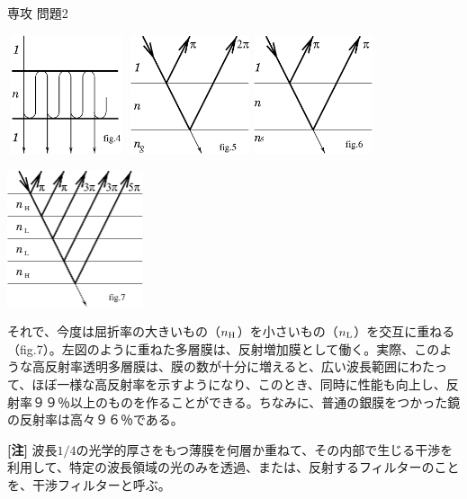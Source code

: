 \documentclass[fleqn]{jbook}
\begin{document}
\begin{answer}{専攻 問題2}{}
\begin{subanswers}
\begin{center}
\includegraphics[clip,height=35mm,width=35mm]{1997phy2-4.eps}\hspace{15mm}
\includegraphics[clip,height=35mm,width=35mm]{1997phy2-5.eps}\hspace{15mm}
\includegraphics[clip,height=35mm,width=35mm]{1997phy2-6.eps}
\end{center}

\parbox[t]{50mm}{\vspace*{-5mm}
\begin{center}
\includegraphics[clip,height=40mm,width=40mm]{1997phy2-7.eps}
\end{center}}\parbox[t]{110mm}{それで、今度は屈折率の大きいもの（$n_{\rm{H}}$）を小さいもの（$n_{\rm{L}}$）を交互に重ねる（fig.7）。左図のように重ねた多層膜は、反射増加膜として働く。実際、このような高反射率透明多層膜は、膜の数が十分に増えると、広い波長範囲にわたって、ほぼ一様な高反射率を示すようになり、このとき、同時に性能も向上し、反射率９９％以上のものを作ることができる。ちなみに、普通の銀膜をつかった鏡の反射率は高々９６％である。 

{\bf{[注]}} 波長$1/4$の光学的厚さをもつ薄膜を何層か重ねて、その内部で生じる干渉を利用して、特定の波長領域の光のみを透過、または、反射するフィルターのことを、干渉フィルターと呼ぶ。}



\end{subanswers}
\end{answer}
\end{document}
